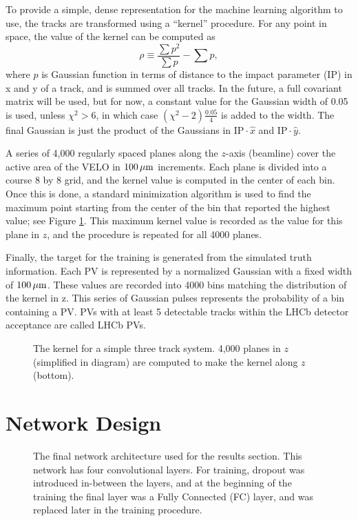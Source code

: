 \documentclass[a4paper]{jpconf}
\begin{document}
To provide a simple, dense representation for the machine learning algorithm to use, the tracks are transformed using a ``kernel'' procedure. For any point in space, the value of the kernel can be computed as 
%
\begin{equation}
\rho \equiv  \frac{ \sum  p^2}{\sum  p} - \sum p,
\end{equation}
%
where $p$ is Gaussian function in terms of distance to the impact parameter (IP) in x and y of a track, and is summed over all tracks.
In the future, a full covariant matrix will be used, but for now, a constant value for the Gaussian width of 0.05 is used, unless $\chi^2>6$, in which case $ (\chi^2-2)\frac{0.05}{4} $ is added to the width.
The final Gaussian is just the product of the Gaussians in $ \mathrm{IP} \cdot \hat{x}$ and $ \mathrm{IP} \cdot \hat{y}$.

A series of 4,000 regularly spaced planes along the $z$-axis (beamline) cover the active area of the VELO in $\unit[100]{\mu m}$ increments. Each plane is divided into a course 8 by 8 grid, and the kernel value is computed in the center of each bin. Once this is done, a standard minimization algorithm is used to find the maximum point starting from the center of the bin that reported the highest value; see Figure \ref{fig:kernel}. This maximum kernel value is recorded as the value for this plane in $z$, and the procedure is repeated for all 4000 planes.

Finally, the target for the training is generated from the simulated truth information. Each PV is represented by a normalized Gaussian with a fixed width of $\unit[100]{\mu m}$. These values are recorded into 4000 bins matching the distribution of the kernel in z. This series of Gaussian pulses represents the probability of a bin containing a PV.  %
PVs with at least 5 detectable tracks within the LHCb detector acceptance are called LHCb PVs.

\begin{figure}
	\centering
	
	\caption{The kernel for a simple three track system. 4,000 planes in $z$ (simplified in diagram) are computed to make the kernel along $z$ (bottom).}
	\label{fig:kernel}
\end{figure}

\section{Network Design}

\begin{figure}
	\centering
	
	\caption{The final network architecture used for the results section. This network has four convolutional layers. For training, dropout was introduced in-between the layers, and at the beginning of the training the final layer was a Fully Connected (FC) layer, and was replaced later in the training procedure.}
	\label{fig:nnarch}
\end{figure}
\end{document}

